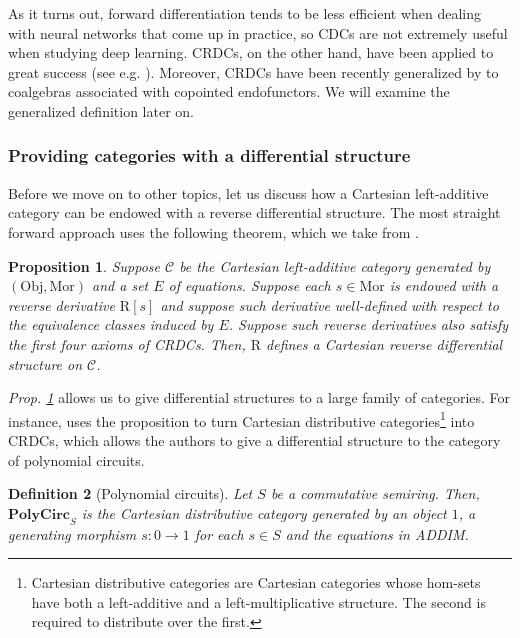 \documentclass[12pt,a4paper,openright,twoside]{report}
\theoremstyle{plain}
\newtheorem{proposition}{Proposition}
\newtheorem{definition}[proposition]{Definition}
\theoremstyle{definition}
\begin{document}
As it turns out, forward differentiation tends to be less efficient when dealing with neural networks that come up in practice, so CDCs are not extremely useful when studying deep learning. CRDCs, on the other hand, have been applied to great success (see e.g. \cite{cruttwell2022categorical}). Moreover, CRDCs have been recently generalized by \cite{gavranovic2024fundamental} to coalgebras associated with copointed endofunctors. We will examine the generalized definition later on.


\subsubsection{Providing categories with a differential structure}


Before we move on to other topics, let us discuss how a Cartesian left-additive category can be endowed with a reverse differential structure. The most straight forward approach uses the following theorem, which we take from \cite{wilson2022categories}.

\begin{proposition}
  \label{prop: crdcfromgen}
  Suppose $\mathcal{C}$ be the Cartesian left-additive category generated by $(\mathrm{Obj}, \mathrm{Mor})$ and a set $E$ of equations. Suppose each $s \in \mathrm{Mor}$ is endowed with a reverse derivative $\mathrm{R}[s]$ and suppose such derivative well-defined with respect to the equivalence classes induced by $E$. Suppose such reverse derivatives also satisfy the first four axioms of CRDCs. Then, $\mathrm{R}$ defines a Cartesian reverse differential structure on $\mathcal{C}$.
\end{proposition}

\textit{Prop. \ref{prop: crdcfromgen}} allows us to give differential structures to a large family of categories. For instance, \cite{wilson2022categories} uses the proposition to turn Cartesian distributive categories\footnote{Cartesian distributive categories are Cartesian categories whose hom-sets have both a left-additive and a left-multiplicative structure. The second is required to distribute over the first.} into CRDCs, which allows the authors to give a differential structure to the category of polynomial circuits.


\begin{definition}[Polynomial circuits]
  \label{def: polycirc}
  Let $S$ be a commutative semiring. Then, $\mathbf{PolyCirc}_S$ is the Cartesian distributive category generated by an object $1$, a generating morphism $s: 0 \to 1$ for each $s \in S$ and the equations in ADDIM.
\end{definition}
\end{document}
